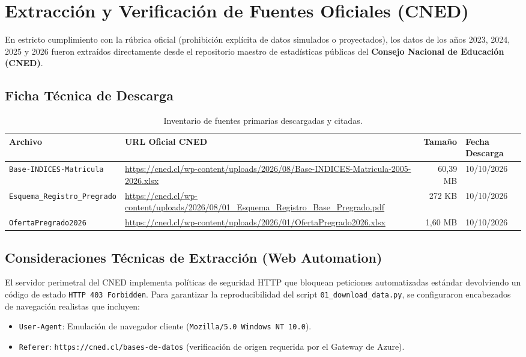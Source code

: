\documentclass[11pt,a4paper]{article}
\begin{document}
\section{Extracción y Verificación de Fuentes Oficiales (CNED)}
En estricto cumplimiento con la rúbrica oficial (prohibición explícita de datos simulados o proyectados), los datos de los años 2023, 2024, 2025 y 2026 fueron extraídos directamente desde el repositorio maestro de estadísticas públicas del \textbf{Consejo Nacional de Educación (CNED)}.

\subsection{Ficha Técnica de Descarga}
\begin{table}[h!]
\centering
\small
\begin{tabularx}{\textwidth}{|l|X|r|l|}
\hline
\textbf{Archivo} & \textbf{URL Oficial CNED} & \textbf{Tamaño} & \textbf{Fecha Descarga} \\
\hline
\texttt{Base-INDICES-Matricula} & \url{https://cned.cl/wp-content/uploads/2026/08/Base-INDICES-Matricula-2005-2026.xlsx} & 60,39 MB & 10/10/2026 \\
\hline
\texttt{Esquema\_Registro\_Pregrado} & \url{https://cned.cl/wp-content/uploads/2026/08/01_Esquema_Registro_Base_Pregrado.pdf} & 272 KB & 10/10/2026 \\
\hline
\texttt{OfertaPregrado2026} & \url{https://cned.cl/wp-content/uploads/2026/01/OfertaPregrado2026.xlsx} & 1,60 MB & 10/10/2026 \\
\hline
\end{tabularx}
\caption{Inventario de fuentes primarias descargadas y citadas.}
\end{table}

\subsection{Consideraciones Técnicas de Extracción (Web Automation)}
El servidor perimetral del CNED implementa políticas de seguridad HTTP que bloquean peticiones automatizadas estándar devolviendo un código de estado \texttt{HTTP 403 Forbidden}. Para garantizar la reproducibilidad del script \texttt{01\_download\_data.py}, se configuraron encabezados de navegación realistas que incluyen:
\begin{itemize}
    \item \texttt{User-Agent}: Emulación de navegador cliente (\texttt{Mozilla/5.0 Windows NT 10.0}).
    \item \texttt{Referer}: \texttt{https://cned.cl/bases-de-datos} (verificación de origen requerida por el Gateway de Azure).
\end{itemize}
\end{document}
